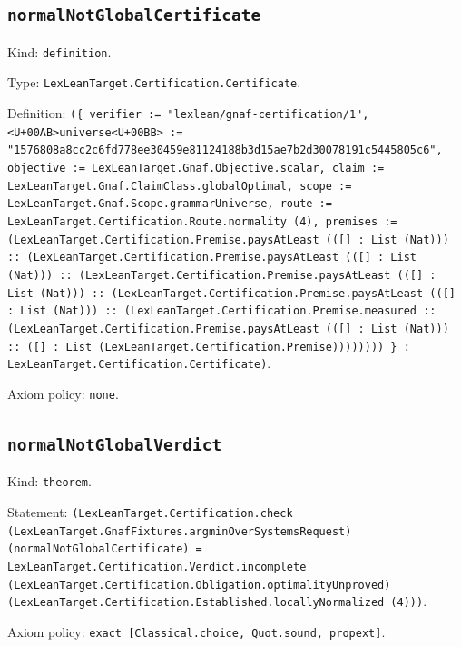 \documentclass[11pt]{article}
\begin{document}
\subsection*{\texttt{normalNotGlobalCertificate}}
\noindent Kind: \texttt{definition}.\par
\noindent Type: \texttt{LexLeanTarget.Certification.Certificate}.\par
\noindent Definition: \texttt{(\{ verifier := "lexlean/gnaf-certification/1", <U+00AB>universe<U+00BB> := "1576808a8cc2c6fd778ee30459e81124188b3d15ae7b2d30078191c5445805c6", objective := LexLeanTarget.Gnaf.Objective.scalar, claim := LexLeanTarget.Gnaf.ClaimClass.globalOptimal, scope := LexLeanTarget.Gnaf.Scope.grammarUniverse, route := LexLeanTarget.Certification.Route.normality (4), premises := (LexLeanTarget.Certification.Premise.paysAtLeast (([] : List (Nat))) :: (LexLeanTarget.Certification.Premise.paysAtLeast (([] : List (Nat))) :: (LexLeanTarget.Certification.Premise.paysAtLeast (([] : List (Nat))) :: (LexLeanTarget.Certification.Premise.paysAtLeast (([] : List (Nat))) :: (LexLeanTarget.Certification.Premise.measured :: (LexLeanTarget.Certification.Premise.paysAtLeast (([] : List (Nat))) :: ([] : List (LexLeanTarget.Certification.Premise)))))))) \} : LexLeanTarget.Certification.Certificate)}.\par
\noindent Axiom policy: \texttt{none}.\par
\subsection*{\texttt{normalNotGlobalVerdict}}
\noindent Kind: \texttt{theorem}.\par
\noindent Statement: \texttt{(LexLeanTarget.Certification.check (LexLeanTarget.GnafFixtures.argminOverSystemsRequest) (normalNotGlobalCertificate) = LexLeanTarget.Certification.Verdict.incomplete (LexLeanTarget.Certification.Obligation.optimalityUnproved) (LexLeanTarget.Certification.Established.locallyNormalized (4)))}.\par
\noindent Axiom policy: \texttt{exact [Classical.choice, Quot.sound, propext]}.\par
\end{document}
